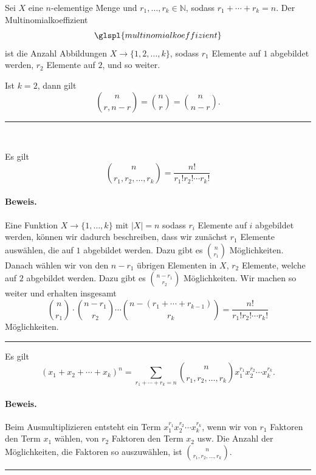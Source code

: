 \documentclass[9pt]{article}
\begin{document}
\begin{defi}

    Sei \( X \) eine \( n \)-elementige Menge und \( r_1, \dots, r_k \in \mathbb{N} \), sodass \( r_1 + \cdots + r_k = n \). Der Multinomialkoeffizient
\[
\glspl{multinomialkoeffizient}
\]
ist die Anzahl Abbildungen \( X \to \{1, 2, \dots, k\} \), sodass \( r_1 \) Elemente auf \( 1 \) abgebildet werden, \( r_2 \) Elemente auf \( 2 \), und so weiter.

Ist \( k = 2 \), dann gilt
\[
\binom{n}{r, n-r} = \binom{n}{r} = \binom{n}{n-r}.
\]
\end{defi} \noindent \rule{8cm}{0.4pt} \\
\begin{satz}
Es gilt
\[
\binom{n}{r_1, r_2, \ldots, r_k} = \frac{n!}{r_1! r_2! \cdots r_k!}
\]
\paragraph{Beweis.} Eine Funktion \( X \rightarrow \{1, \ldots, k\} \) mit \( |X| = n \) sodass \( r_i \) Elemente auf \( i \) abgebildet werden, können wir dadurch beschreiben, dass wir zunächst \( r_1 \) Elemente auswählen, die auf \( 1 \) abgebildet werden. Dazu gibt es \( \binom{n}{r_1} \) Möglichkeiten. Danach wählen wir von den \( n - r_1 \) übrigen Elementen in \( X \), \( r_2 \) Elemente, welche auf \( 2 \) abgebildet werden. Dazu gibt es \( \binom{n - r_1}{r_2} \) Möglichkeiten. Wir machen so weiter und erhalten insgesamt
\[
\binom{n}{r_1} \cdot \binom{n - r_1}{r_2} \cdots \binom{n - (r_1 + \cdots + r_{k-1})}{r_k} = \frac{n!}{r_1! r_2! \cdots r_k!}
\]
Möglichkeiten.
 \end{satz} \noindent \rule{8cm}{0.4pt}
\begin{satz}
Es gilt
\[
(x_1 + x_2 + \cdots + x_k)^n = \sum_{r_1 + \cdots + r_k = n} \binom{n}{r_1, r_2, \ldots, r_k} x_1^{r_1} x_2^{r_2} \cdots x_k^{r_k}.
\]
\paragraph{Beweis.} Beim Ausmultiplizieren entsteht ein Term \( x_1^{r_1} x_2^{r_2} \cdots x_k^{r_k} \), wenn wir von \( r_1 \) Faktoren den Term \( x_1 \) wählen, von \( r_2 \) Faktoren den Term \( x_2 \) usw. Die Anzahl der Möglichkeiten, die Faktoren so auszuwählen, ist \( \binom{n}{r_1, r_2, \ldots, r_k} \).

 \end{satz} \noindent \rule{8cm}{0.4pt}
\end{document}
